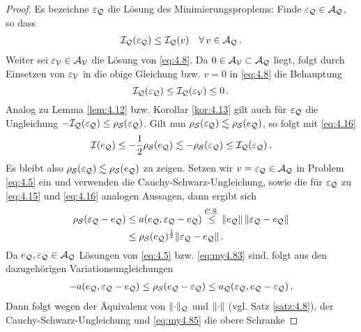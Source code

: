 \begin{proof}
Es bezeichne $\varepsilon_{\mathcal Q}$ die Lösung des Minimierungsproplems: Finde $\varepsilon_{\mathcal Q}\in \mathcal A_{\mathcal Q}$, so dass
\begin{align}\label{eq:my4.83}
	\mathcal I_{\mathcal Q} (\varepsilon_{\mathcal Q}) \le \mathcal I_{\mathcal Q} (v) \quad \forall \, v \in \mathcal A_{\mathcal Q} \, .
\end{align}
Weiter sei $\varepsilon_{\mathcal V}\in \mathcal A_{\mathcal V}$ die Lösung von \eqref{eq:4.8}. Da $0 \in \mathcal A_{\mathcal V} \subset \mathcal A_{\mathcal Q}$ liegt, folgt durch Einsetzen von $\varepsilon_{\mathcal V}$ in die obige Gleichung bzw. $v = 0$ in \eqref{eq:4.8} die Behauptung
\[
	\mathcal I_{\mathcal Q}(\varepsilon_{\mathcal Q}) \le \mathcal I_{\mathcal Q} (\varepsilon_{\mathcal V}) \le 0 \, .
\]
Analog zu Lemma \ref{lem:4.12} bzw. Korollar \ref{kor:4.13} gilt auch für $\varepsilon_{\mathcal Q}$ die Ungleichung $-\mathcal I_{\mathcal Q} (\varepsilon_{\mathcal Q}) \le \rho_{\mathcal S} (\varepsilon_{\mathcal Q})$. Gilt nun $\rho_{\mathcal S} (\varepsilon_{\mathcal Q}) \lesssim \rho_{\mathcal S}(e_{\mathcal Q})$, so folgt mit \eqref{eq:4.16}
\[
	\mathcal I(e_{\mathcal Q}) \le -\frac 12 \rho_{\mathcal S} (e_{\mathcal Q}) \lesssim -\rho_{\mathcal S} (\varepsilon_{\mathcal Q}) \le \mathcal I_{\mathcal Q}(\varepsilon_{\mathcal Q}) \, .
\]
Es bleibt also $\rho_{\mathcal S} (\varepsilon_{\mathcal Q}) \lesssim \rho_{\mathcal S}(e_{\mathcal Q})$ zu zeigen. Setzen wir $v = \varepsilon_{\mathcal Q}\in \mathcal A_{\mathcal Q}$ in Problem \eqref{eq:4.5} ein und verwenden die Cauchy-Schwarz-Ungleichung, sowie die für $\varepsilon_{\mathcal Q}$ zu \eqref{eq:4.15} und \eqref{eq:4.16} analogen Aussagen, dann ergibt sich
\begin{align}\label{eq:my4.84}
\begin{aligned}
	\rho_{\mathcal S} (\varepsilon_{\mathcal Q}-e_{\mathcal Q}) &\le a(e_{\mathcal Q},\varepsilon_{\mathcal Q}-e_{\mathcal Q}) \stackrel{\scriptsize \text{C.S.}}\le \lVert e_{\mathcal Q}\rVert \, \lVert \varepsilon_{\mathcal Q}-e_{\mathcal Q}\rVert \\
	& \le \rho_{\mathcal S}(e_{\mathcal Q})^{\frac 12} \lVert \varepsilon_{\mathcal Q}-e_{\mathcal Q}\rVert \, .
\end{aligned}
\end{align}
Da $e_{\mathcal Q},\varepsilon_{\mathcal Q}\in \mathcal A_{\mathcal Q}$ Lösungen von \eqref{eq:4.5} bzw. \eqref{eq:my4.83} sind, folgt aus den dazugehörigen Variationsungleichungen
\begin{align}\label{eq:my4.85}
	-a(e_{\mathcal Q}, \varepsilon_{\mathcal Q}-e_{\mathcal Q}) \le \rho_{\mathcal S} (e_{\mathcal Q}-\varepsilon_{\mathcal Q}) \le a_{\mathcal Q} (\varepsilon_{\mathcal Q},e_{\mathcal Q}-\varepsilon_{\mathcal Q}) \, .
\end{align}
Dann folgt wegen der Äquivalenz von $\lVert \cdot\rVert_{\mathcal Q}$ und $\lVert \cdot\rVert$ (vgl. Satz \ref{satz:4.8}), der Cauchy-Schwarz-Ungleichung und \eqref{eq:my4.85} die obere Schranke

\end{proof}
